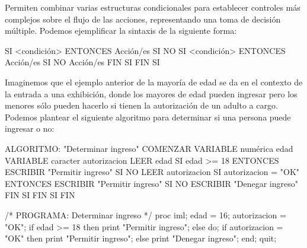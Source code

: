 \documentclass[
]{book}
\newenvironment{Shaded}{\begin{snugshade}}{\end{snugshade}}
\newcommand{\NormalTok}[1]{#1}
\begin{document}
Permiten combinar varias estructuras condicionales para establecer controles más complejos sobre el flujo de las acciones, representando una toma de decisión múltiple. Podemos ejemplificar la sintaxis de la siguiente forma:

\begin{Shaded}
\begin{Highlighting}[]
\NormalTok{SI \textless{}condición\textgreater{} }
\NormalTok{    ENTONCES}
\NormalTok{        Acción/es}
\NormalTok{    SI NO}
\NormalTok{        SI \textless{}condición\textgreater{} }
\NormalTok{            ENTONCES}
\NormalTok{                Acción/es}
\NormalTok{            SI NO}
\NormalTok{                Acción/es}
\NormalTok{        FIN SI}
\NormalTok{FIN SI}
\end{Highlighting}
\end{Shaded}

Imaginemos que el ejemplo anterior de la mayoría de edad se da en el contexto de la entrada a una exhibición, donde los mayores de edad pueden ingresar pero los menores sólo pueden hacerlo si tienen la autorización de un adulto a cargo. Podemos plantear el siguiente algoritmo para determinar si una persona puede ingresar o no:

\begin{Shaded}
\begin{Highlighting}[]
\NormalTok{ALGORITMO: "Determinar ingreso"}
\NormalTok{COMENZAR}
\NormalTok{    VARIABLE numérica edad}
\NormalTok{    VARIABLE caracter autorizacion}
\NormalTok{    LEER edad}
\NormalTok{    SI edad \textgreater{}= 18 }
\NormalTok{        ENTONCES}
\NormalTok{            ESCRIBIR "Permitir ingreso"}
\NormalTok{        SI NO}
\NormalTok{            LEER autorizacion}
\NormalTok{            SI autorizacion = "OK" }
\NormalTok{                ENTONCES}
\NormalTok{                    ESCRIBIR "Permitir ingreso"}
\NormalTok{                SI NO}
\NormalTok{                    ESCRIBIR "Denegar ingreso"}
\NormalTok{            FIN SI}
\NormalTok{    FIN SI}
\NormalTok{FIN}
\end{Highlighting}
\end{Shaded}

\begin{Shaded}
\begin{Highlighting}[]
\NormalTok{/* PROGRAMA: Determinar ingreso */}
\NormalTok{proc iml;}
\NormalTok{    edad = 16;}
\NormalTok{    autorizacion = "OK";}
\NormalTok{    if edad \textgreater{}= 18 then print "Permitir ingreso";}
\NormalTok{    else do;}
\NormalTok{        if autorizacion = "OK" then print "Permitir ingreso";}
\NormalTok{        else print "Denegar ingreso";}
\NormalTok{    end;}
\NormalTok{quit;}
\end{Highlighting}
\end{Shaded}
\end{document}

